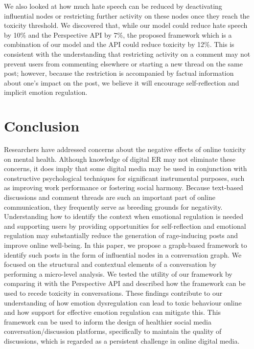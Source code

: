 \documentclass[acmtog]{acmart}
\begin{document}
We also looked at how much hate speech can be reduced by deactivating influential nodes or restricting further activity on these nodes once they reach the toxicity threshold. We discovered that, while our model could reduce hate speech by 10\% and the Perspective API by 7\%, the proposed framework which is a combination of our model and the API could reduce toxicity by 12\%. This is consistent with the understanding that restricting activity on a comment may not prevent users from commenting elsewhere or starting a new thread on the same post; however, because the restriction is accompanied by factual information about one's impact on the post, we believe it will encourage self-reflection and implicit emotion regulation.












\section{Conclusion}
Researchers have addressed concerns about the negative effects of online toxicity on mental health. Although knowledge of digital ER may not eliminate these concerns, it does imply that some digital media may be used in conjunction with constructive psychological techniques for significant instrumental purposes, such as improving work performance or fostering social harmony. Because text-based discussions and comment threads are such an important part of online communication, they frequently serve as breeding grounds for negativity. Understanding how to identify the context when emotional regulation is needed and supporting users by providing opportunities for self-reflection and emotional regulation may substantially reduce the generation of rage-inducing posts and improve online well-being.
In this paper, we propose a graph-based framework to identify such posts in the form of influential nodes in a conversation graph. We focused on the structural and contextual elements of a conversation by performing a micro-level analysis. We tested the utility of our framework by comparing it with the Perspective API and described how the framework can be used to recede toxicity in conversations. These findings contribute to our understanding of how emotion dysregulation can lead to toxic behaviour online and how support for effective emotion regulation can mitigate this. This framework can be used to inform the design of healthier social media conversation/discussion platforms, specifically to maintain the quality of discussions, which is regarded as a persistent challenge in online digital media.
\end{document}
